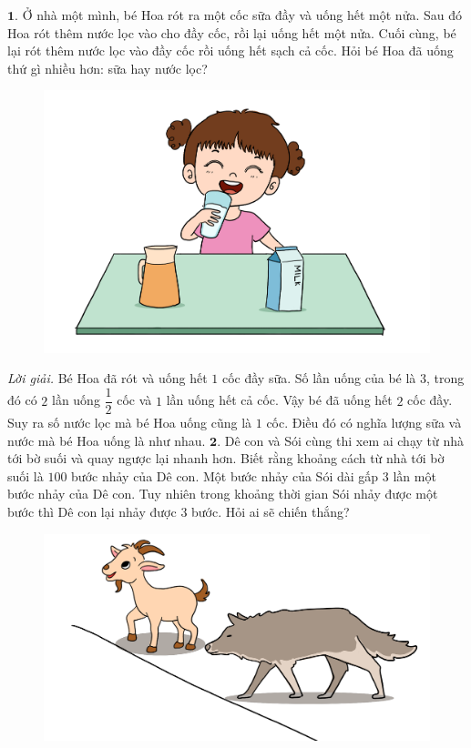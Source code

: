 \begin{multicols}{2}
	$\pmb{1.}$ Ở nhà một mình, bé Hoa rót ra một cốc sữa đầy và uống hết một nửa. Sau đó Hoa rót thêm nước lọc vào cho đầy cốc, rồi lại uống hết một nửa. Cuối cùng, bé lại rót thêm nước lọc vào đầy cốc rồi uống hết sạch cả cốc. Hỏi bé Hoa đã uống thứ gì nhiều hơn: sữa hay nước lọc?
	\begin{figure}[H]
		\centering
		\vspace*{-10pt}
		\captionsetup{labelformat= empty, justification=centering}
		\includegraphics[width=0.85\linewidth]{Pi6_bai1}
		\vspace*{-5pt}
	\end{figure}
	\textit{Lời giải.} 	Bé Hoa đã rót và uống hết $1$ cốc đầy sữa. Số lần uống của bé là $3$, trong đó có $2$ lần uống $\dfrac{1}{2}$ cốc và $1$ lần uống hết cả cốc. Vậy bé đã uống hết $2$ cốc đầy. Suy ra số nước lọc mà bé Hoa uống cũng là $1$ cốc. Điều đó có nghĩa lượng sữa và nước mà bé Hoa uống là như nhau.
	\vskip 0.1cm
 	$\pmb{2.}$ Dê con và Sói cùng thi xem ai chạy từ nhà tới bờ suối và quay ngược lại nhanh hơn. Biết rằng khoảng cách từ nhà tới bờ suối là $100$ bước nhảy của Dê con. Một bước nhảy của Sói dài gấp $3$ lần một bước nhảy của Dê con. Tuy nhiên trong khoảng thời gian Sói nhảy được một bước thì Dê con lại nhảy được $3$ bước. Hỏi ai sẽ chiến thắng?
	\begin{figure}[H]
		\centering
		\vspace*{-5pt}
		\captionsetup{labelformat= empty, justification=centering}
		\includegraphics[width=0.85\linewidth]{Pi6_bai2}

\end{figure}
\end{multicols}
